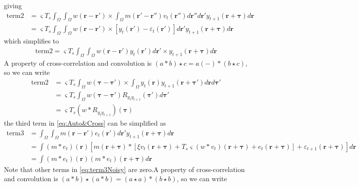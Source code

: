 \documentclass[]{article}
\begin{document}
giving
\begin{align}
	\text{term2} &=  \varsigma T_s \int_{\Omega}\int_{\Omega} w(\mathbf{r}-\mathbf{r}') 
	\times \int_{\Omega} m(\mathbf{r}'-\mathbf{r}'')  v_t(\mathbf{r}'') d\mathbf{r}'' d\mathbf{r}' y_{t+1}(\mathbf{r}+\boldsymbol{\tau}) d\mathbf{r} \nonumber \\
&=\varsigma T_s \int_{\Omega}\int_{\Omega} w(\mathbf{r}-\mathbf{r}') 
	\times \left[y_t(\mathbf r')- \varepsilon_t(\mathbf r')\right]  d\mathbf{r}' y_{t+1}(\mathbf{r}+\boldsymbol{\tau}) d\mathbf{r}
\end{align}
which simplifies to
\begin{align}
	\text{term2}=  \varsigma T_s \int_{\Omega}\int_{\Omega} w(\mathbf{r}-\mathbf{r}')y_t(\mathbf{r}') d\mathbf{r}' 
	\times y_{t+1}(\mathbf{r}+\boldsymbol{\tau}) d\mathbf{r}
\end{align}
A property of cross-correlation and convolution is $(a \ast b) \star c = a(-)\ast(b \star c)$, so we can write
\begin{align}
	\text{term2}&= \varsigma T_s \int_{\Omega} w(\boldsymbol{\tau}-\boldsymbol{\tau}') 
	\times \int_{\Omega} y_t(\mathbf{r}) y_{t+1}(\mathbf{r}+\boldsymbol{\tau}') d\mathbf{r}d\boldsymbol{\tau}' \nonumber \\
	&= \varsigma T_s \int_{\Omega} w(\boldsymbol{\tau}-\boldsymbol{\tau}') R_{y_ty_{t+1}}(\boldsymbol{\tau}')d\boldsymbol{\tau}' \nonumber \\
	&=\varsigma T_s \left(w \ast R_{y_ty_{t+1}} \right)(\boldsymbol{\tau})
\end{align}
the third term in \eqref{eq:Auto&Cross} can be simplified as
\begin{align}\label{eq:term3Noisy}
\text{term3}&=\int_{\Omega}\int_{\Omega} m(\mathbf{r}-\mathbf{r}')e_t(\mathbf{r}')d\mathbf{r}'y_{t+1}(\mathbf{r}+\boldsymbol{\tau})  d\mathbf{r} \nonumber \\
&=\int \left(m \ast e_t\right)(\mathbf r)\left[m\left(\mathbf{r}+\boldsymbol\tau\right) \ast \left[\xi v_t\left(\mathbf{r}+\boldsymbol\tau\right) + 
	T_s \varsigma \left(w \ast v_t\right)(\mathbf r + \boldsymbol \tau)
	+ e_t\left(\mathbf{r}+\boldsymbol{\tau}\right) \right]+\varepsilon_{t+1}(\mathbf r+\boldsymbol\tau) \right]d\mathbf r \nonumber \\
	&=\int\left(m \ast e_t\right)(\mathbf r)\left(m \ast e_t\right)(\mathbf r+\boldsymbol\tau)d\mathbf r
\end{align}
Note that other terms in \ref{eq:term3Noisy} are zero.A property of cross-correlation and convolution is $(a \ast b) \star (a \ast b)=(a \star a)\ast(b \star b)$, so we can write
\end{document}
